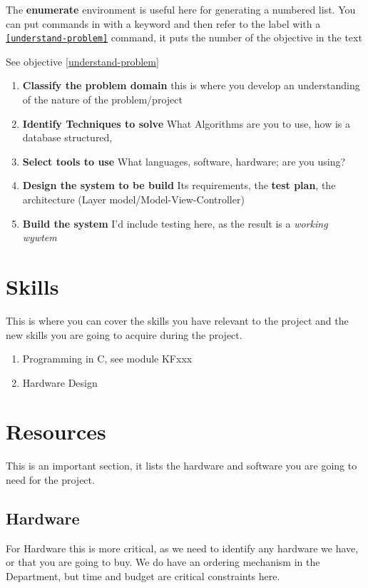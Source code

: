 The \textbf{enumerate} environment is useful here for generating a numbered list.   You can put \texttt{\label{}} commands in with a keyword \texttt{\label{understand-problem}} and then refer to the label with a \texttt{\ref{understand-problem}} command, it puts the number of the objective in the text
\begin{tcblisting}{ }
	See objective \ref{understand-problem}
\end{tcblisting}
\begin{enumerate}
	\item \textbf{Classify the problem domain}\label{understand-problem}  this is where you develop an understanding of the nature of the problem/project
	\item \textbf{Identify Techniques to solve}  What Algorithms are you to use, how is a database structured,
	\item \textbf{Select tools to use}  What languages, software, hardware; are you using?
	\item \textbf{Design the system to be build}\label{write-code}  Its requirements, the \textbf{test plan}, the architecture (Layer model/Model-View-Controller)
	\item \textbf{Build the system}  I'd include testing here, as the result is a \emph{working wywtem}
\end{enumerate}

\section{Skills}
This is where you can cover the skills you have relevant to the project and the new skills you are going to acquire during the project.
\begin{enumerate}
	\item Programming in C, see module KFxxx
	\item Hardware Design
\end{enumerate}

\section{Resources}
This is an important section, it lists the hardware and software you are going to need for the project.

\subsection{Hardware}
For Hardware this is more critical, as we need to identify any hardware we have, or that you are going to buy.  We do have an ordering mechanism in the Department, but time and budget are critical constraints here.

